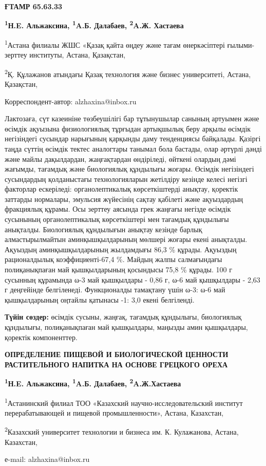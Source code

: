 \newpage
{\bfseries ҒТАМР 65.63.33}


\begin{center}
{\bfseries \textsuperscript{1}Н.E. Альжаксина, \textsuperscript{1}A.Б. Далабаев, \textsuperscript{2}A.Ж. Хастаева}

\textsuperscript{1}Астана филиалы ЖШС «Қазақ қайта өңдеу және тағам
өнеркәсіптері ғылыми-зерттеу институты, Астана, Қазақстан,

\textsuperscript{2}Қ. Құлажанов атындағы Қазақ технология және бизнес
университеті, Астана, Қазақстан,

Корреспондент-автор: alzhaxina@inbox.ru
\end{center}

Лактозаға, сүт казеиніне төзбеушілігі бар тұтынушылар санының артуымен
және өсімдік ақуызына физиологиялық тұрғыдан артықшылық беру арқылы
өсімдік негізіндегі сусындар нарығының қарқынды даму тенденциясы
байқалады. Қазіргі таңда сүттің өсімдік тектес аналогтары танымал бола
бастады, олар әртүрлі дәнді және майлы дақылдардан, жаңғақтардан
өндіріледі, өйткені олардың дәмі жағымды, тағамдық және биологиялық
құндылығы жоғары. Өсімдік негізіндегі сусындардың қолданыстағы
технологияларын жетілдіру кезінде келесі негізгі факторлар ескеріледі:
органолептикалық көрсеткіштерді анықтау, қоректік заттарды нормалары,
эмульсия жүйесінің сақтау қабілеті және ақуыздардың фракциялық құрамы.
Осы зерттеу аясында грек жаңғағы негізде өсімдік сусынының
органолептикалық көрсеткіштері мен тағамдық құндылығы анықталды.
Биологиялық құндылығын анықтау кезінде барлық алмастырылмайтын
аминқышқылдарының мөлшері жоғары екені анықталды. Ақуыздың
аминқышқылдарының жылдамдығы 86,3 \% құрады. Ақуыздың рационалдылық
коэффициенті-67,4 \%. Майдың жалпы салмағындағы полиқанықпаған май
қышқылдарының қосындысы 75,8 \% құрады. 100 г сусынның құрамында ω-3 май
қышқылдары - 0,86 г, ω-6 май қышқылдары - 2,63 г деңгейінде белгіленеді.
Функционалды тамақтану үшін ω-3: ω-6 май қышқылдарының оңтайлы қатынасы
-1: 3,0 екені белгіленді.

{\bfseries Түйін сөздер:} өсімдік сусыны, жаңғақ, тағамдық құндылығы,
биологиялық құндылығы, полиқанықпаған май қышқылдары, маңызды амин
қышқылдары, қоректік компоненттер.

\begin{center}
{\large\bfseries ОПРЕДЕЛЕНИЕ ПИЩЕВОЙ И БИОЛОГИЧЕСКОЙ ЦЕННОСТИ РАСТИТЕЛЬНОГО
НАПИТКА НА ОСНОВЕ ГРЕЦКОГО ОРЕХА}

{\bfseries \textsuperscript{1}Н.E. Альжаксина, \textsuperscript{1}A.Б.
Далабаев, \textsuperscript{2}A.Ж.Хастаева}

\textsuperscript{1}Астанинский филиал ТОО «Казахский
научно-исследовательский институт перерабатывающей и пищевой
промышленности», Астана, Казахстан,

\textsuperscript{2}Казахский университет технологии и бизнеса им. К.
Кулажанова, Астана, Казахстан,

е-mail: alzhaxina@inbox.ru
\end{center}


